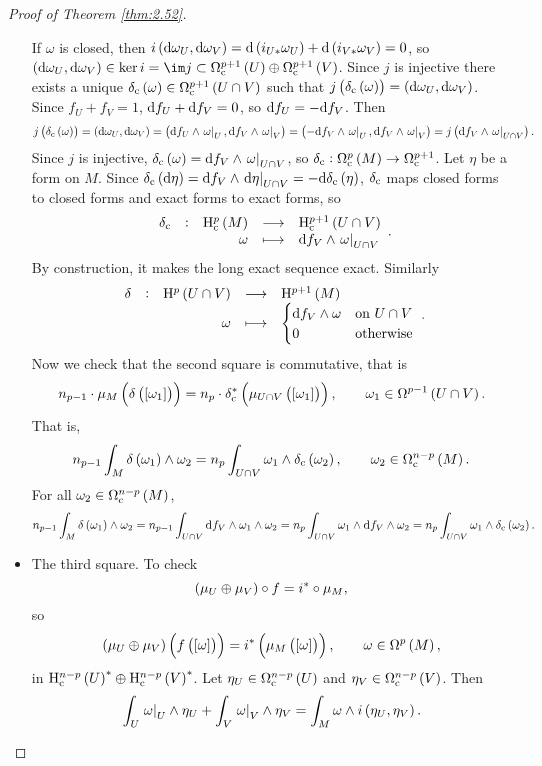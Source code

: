 \begin{proof}[Proof of Theorem \ref{thm:2.52}]
\begin{itemize}
If $ \omega $ is closed, then $ i\br{\d\omega_U, \d\omega_V} = \d\br{i_{U*}\omega_U} + \d\br{i_{V*}\omega_V} = 0 $, so $ \br{\d\omega_U, \d\omega_V} \in \ker i = \im j \subset \Omega_\c^{p + 1}\br{U} \oplus \Omega_\c^{p + 1}\br{V} $. Since $ j $ is injective there exists a unique $ \delta_\c\br{\omega} \in \Omega_\c^{p + 1}\br{U \cap V} $ such that $ j\br{\delta_\c\br{\omega}} = \br{\d\omega_U, \d\omega_V} $. Since $ f_U + f_V = 1 $, $ \mathrm{d} f_U + \mathrm{d} f_V = 0 $, so $ \mathrm{d} f_U = -\mathrm{d} f_V $. Then
$$ j\br{\delta_\c\br{\omega}} = \br{\d\omega_U, \d\omega_V} = \br{\d f_U \wedge \eval{\omega}_U, \d f_V \wedge \eval{\omega}_V} = \br{-\d f_V \wedge \eval{\omega}_U, \d f_V \wedge \eval{\omega}_V} = j\br{\d f_V \wedge \eval{\omega}_{U \cap V}}. $$
Since $ j $ is injective, $ \delta_\c\br{\omega} = \d f_V \wedge \eval{\omega}_{U \cap V} $, so $ \delta_\c : \Omega_\c^p\br{M} \to \Omega_\c^{p + 1} $. Let $ \eta $ be a form on $ M $. Since $ \delta_\c\br{\d\eta} = \d f_V \wedge \eval{\d \eta}_{U \cap V} = -\d\delta_\c\br{\eta} $, $ \delta_{\mathrm{c}} $ maps closed forms to closed forms and exact forms to exact forms, so
$$ \function[\delta_\c]{\H_\c^p\br{M}}{\H_\c^{p + 1}\br{U \cap V}}{\omega}{\d f_V \wedge \eval{\omega}_{U \cap V}}. $$
By construction, it makes the long exact sequence exact. Similarly
$$ \function[\delta]{\H^p\br{U \cap V}}{\H^{p + 1}\br{M}}{\omega}{
\begin{cases}
\d f_V \wedge \omega & \text{on} \ U \cap V \\
0 & \text{otherwise}
\end{cases}
}.
$$
Now we check that the second square is commutative, that is
$$ n_{p - 1} \cdot \mu_M\br{\delta\br{\sbr{\omega_1}}} = n_p \cdot \delta_\c^*\br{\mu_{U \cap V}\br{\sbr{\omega_1}}}, \qquad \omega_1 \in \Omega^{p - 1}\br{U \cap V}. $$
That is,
$$ n_{p - 1}\int_M \delta\br{\omega_1} \wedge \omega_2 = n_p\int_{U \cap V} \omega_1 \wedge \delta_\c\br{\omega_2}, \qquad \omega_2 \in \Omega_\c^{n - p}\br{M}. $$
For all $ \omega_2 \in \Omega_\c^{n - p}\br{M} $,
$$ n_{p - 1}\int_M \delta\br{\omega_1} \wedge \omega_2 = n_{p - 1}\int_{U \cap V} \d f_V \wedge \omega_1 \wedge \omega_2 = n_p\int_{U \cap V} \omega_1 \wedge \d f_V \wedge \omega_2 = n_p\int_{U \cap V} \omega_1 \wedge \delta_\c\br{\omega_2}. $$
\item The third square. To check
$$ \br{\mu_U \oplus \mu_V} \circ f = i^* \circ \mu_M, $$
so
$$ \br{\mu_U \oplus \mu_V}\br{f\br{\sbr{\omega}}} = i^*\br{\mu_M\br{\sbr{\omega}}}, \qquad \omega \in \Omega^p\br{M}, $$
in $ \H_\c^{n - p}\br{U}^* \oplus \H_\c^{n - p}\br{V}^* $. Let $ \eta_U \in \Omega_\c^{n - p}\br{U} $ and $ \eta_V \in \Omega_\c^{n - p}\br{V} $. Then
$$ \int_U \eval{\omega}_U \wedge \eta_U + \int_V \eval{\omega}_V \wedge \eta_V = \int_M \omega \wedge i\br{\eta_U, \eta_V}. $$
\end{itemize}
\end{proof}

